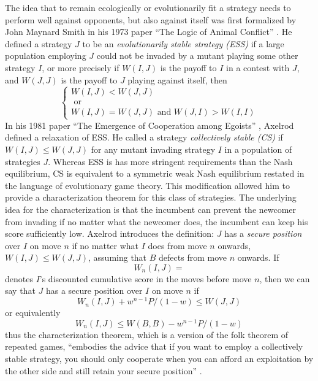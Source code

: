 The idea that to remain ecologically or evolutionarily fit a strategy needs to perform well against opponents, but also against itself was first formalized by John Maynard Smith in his 1973 paper ``The Logic of Animal Conflict'' \cite{MaynardSmith1973}. He defined a strategy $J$ to be an \textit{evolutionarily stable strategy (ESS)} if a large population employing $J$ could not be invaded by a mutant playing some other strategy $I$, or more precisely if $W(I, J)$ is the payoff to $I$ in a contest with $J$, and $W(J, J)$ is the payoff to $J$ playing against itself, then
\begin{equation} \label{eq:ESS}
\begin{cases} 
W(I, J) < W(J, J)\\
\textrm{ or}\\
W(I, J) = W(J, J) \textrm{ and } W(J, I) > W(I, I)
\end{cases}
\end{equation}
In his 1981 paper ``The Emergence of Cooperation among Egoists'' \cite{RobertAxelrod_1981}, Axelrod defined a relaxation of ESS. He called a strategy \textit{collectively stable (CS)} if $W(I, J) \leq W(J, J)$ for any mutant invading strategy $I$ in a population of strategies $J$. Whereas ESS is has more stringent requirements than the Nash equilibrium, CS is equivalent to a symmetric weak Nash equilibrium restated in the language of evolutionary game theory. This modification allowed him to provide a characterization theorem for this class of strategies. The underlying idea for the characterization is that the incumbent can prevent the newcomer from invading if no matter what the newcomer does, the incumbent can keep his score sufficiently low. Axelrod introduces the definition: $J$ has a \textit{secure position} over $I$ on move $n$ if no matter what $I$ does from move $n$ onwards, $W(I,J) \leq W(J,J)$, assuming that $B$ defects from move $n$ onwards. If
\[
W_n(I,J) = 
\]
denotes $I$'s discounted cumulative score in the moves before move $n$, then we can say that $J$ has a secure position over $I$ on move $n$ if 
\[
W_n(I, J) + w^{n-1} P/(1-w) \leq W(J, J) 
\]
or equivalently
\begin{equation}\label{eq:secpos}
W_n(I, J) \leq  W(B, B) - w^{n-1} P/(1-w) 
\end{equation}
thus the characterization theorem, which is a version of the folk theorem of repeated games, ``embodies the advice that if you want to employ a collectively stable strategy, you should only cooperate when you can afford an exploitation by the other side and still retain your secure position'' \cite[p.313]{RobertAxelrod_1981}.

